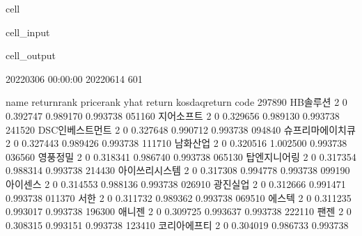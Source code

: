 \documentclass[letterpaper,10pt,english]{jupyterBook}
\begin{document}
\begin{sphinxuseclass}{cell}\begin{sphinxVerbatimInput}

\begin{sphinxuseclass}{cell_input}
\begin{sphinxVerbatim}[commandchars=\\\{\}]
  
\end{sphinxVerbatim}

\end{sphinxuseclass}\end{sphinxVerbatimInput}
\begin{sphinxVerbatimOutput}

\begin{sphinxuseclass}{cell_output}
\begin{sphinxVerbatim}[commandchars=\\\{\}]
2022\PYGZhy{}03\PYGZhy{}06 00:00:00 2022\PYGZhy{}06\PYGZhy{}14
601
\end{sphinxVerbatim}

\begin{sphinxVerbatim}[commandchars=\\\{\}]
             name return\PYGZus{}rank price\PYGZus{}rank      yhat    return  kosdaq\PYGZus{}return  \PYGZbs{}
code                                                                          
297890      HB솔루션           2          0  0.392747  0.989170       0.993738   
051160      지어소프트           2          0  0.329656  0.989130       0.993738   
241520  DSC인베스트먼트           2          0  0.327648  0.990712       0.993738   
094840   슈프리마에이치큐           2          0  0.327443  0.989426       0.993738   
111710       남화산업           2          0  0.320516  1.002500       0.993738   
036560       영풍정밀           2          0  0.318341  0.986740       0.993738   
065130     탑엔지니어링           2          0  0.317354  0.988314       0.993738   
214430    아이쓰리시스템           2          0  0.317308  0.994778       0.993738   
099190       아이센스           2          0  0.314553  0.988136       0.993738   
026910       광진실업           2          0  0.312666  0.991471       0.993738   
011370         서한           2          0  0.311732  0.989362       0.993738   
069510        에스텍           2          0  0.311235  0.993017       0.993738   
196300        애니젠           2          0  0.309725  0.993637       0.993738   
222110         팬젠           2          0  0.308315  0.993151       0.993738   
123410     코리아에프티           2          0  0.304019  0.986733       0.993738   


\end{sphinxVerbatim}
\end{sphinxuseclass}
\end{sphinxVerbatimOutput}
\end{sphinxuseclass}
\end{document}
